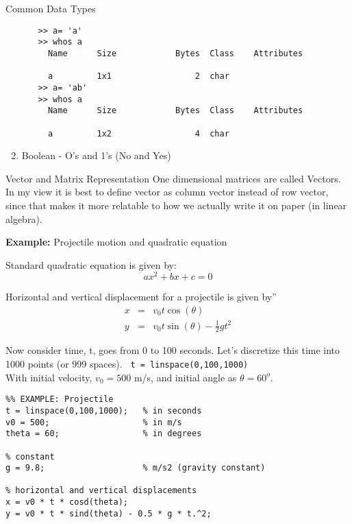 \documentclass[11pt,titlepage,fleqn]{article}
\begin{document}
\begin{section}{Common Data Types}
\begin{enumerate}
\begin{enumerate}
\begin{verbatim}
>> a= 'a'
>> whos a
  Name      Size            Bytes  Class    Attributes

  a         1x1                 2  char  
>> a= 'ab'
>> whos a
  Name      Size            Bytes  Class    Attributes

  a         1x2                 4  char 
\end{verbatim}

\end{enumerate}
\item Boolean - O's and 1's (No and Yes)
\end{enumerate}
\end{section}

\begin{section}{Vector and Matrix Representation}
One dimensional matrices are called Vectors. In my view it is best to define vector as column vector instead of row vector, since that makes it more relatable to how we actually write it on paper (in linear algebra).

{\bf Example:} Projectile motion and quadratic equation

Standard quadratic equation is given by:
\begin{equation}
a x^2 +b x + c = 0 \label{quad}
\end{equation}

Horizontal and vertical displacement for a projectile is given by''
\begin{eqnarray}
x &=& v_0 t \cos(\theta)\\  \label{disp} 
y &=& v_0 t \sin(\theta) - \frac{1}{2} g t^2 
\end{eqnarray}

Now consider time, t, goes from 0 to 100 seconds. Let's discretize this time into 1000 points (or  999 spaces).
\verb+ t = linspace(0,100,1000)+ \\
With initial velocity, $v_0 = 500$ m/s, and initial angle as $\theta = 60^o$.

\begin{verbatim}
%% EXAMPLE: Projectile
t = linspace(0,100,1000);   % in seconds
v0 = 500;                   % in m/s
theta = 60;                 % in degrees

% constant
g = 9.8;                    % m/s2 (gravity constant)

% horizontal and vertical displacements
x = v0 * t * cosd(theta);
y = v0 * t * sind(theta) - 0.5 * g * t.^2;


\end{verbatim}
\end{section}
\end{document}
